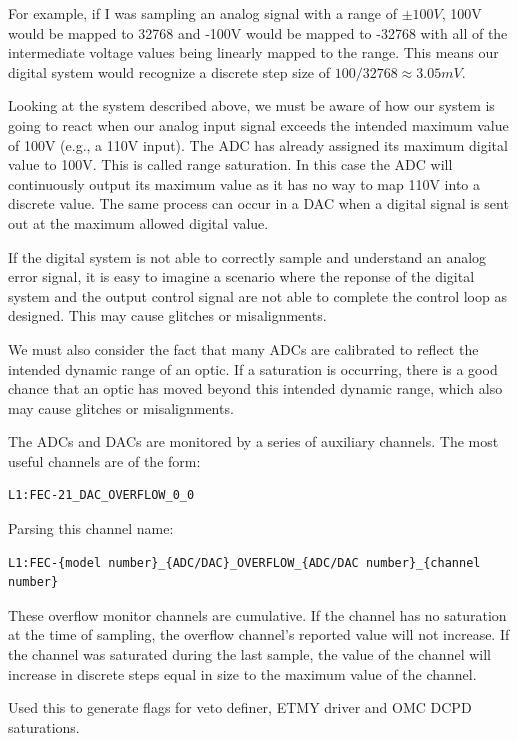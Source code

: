 For example, if I was sampling an analog signal with a range of $\pm100V$, 
100V would be mapped to 32768 and -100V would be mapped to -32768 with all 
of the intermediate voltage values being linearly mapped to the range. This 
means our digital system would recognize a discrete step size of 
$100/32768 \approx 3.05 mV$.

Looking at the system described above, we must be aware of how our system 
is going to react when our analog input signal exceeds the intended maximum 
value of 100V (e.g., a 110V input). The ADC has already assigned its maximum 
digital value to 100V. This is called range saturation. In this case the ADC 
will continuously output its maximum value as it has no way to map 110V into 
a discrete value. The same process can occur in a DAC when a digital signal 
is sent out at the maximum allowed digital value.

If the digital system is not able to correctly sample and understand an analog 
error signal, it is easy to imagine a scenario where the reponse of the digital 
system and the output control signal are not able to complete the control loop 
as designed. This may cause glitches or misalignments.

We must also consider the fact that many ADCs are calibrated to reflect the 
intended dynamic range of an optic.  If a saturation is occurring, there is 
a good chance that an optic has moved beyond this intended dynamic range, which 
also may cause glitches or misalignments.

The ADCs and DACs are monitored by a series of auxiliary channels. 
The most useful channels are of the form:

\begin{verbatim}
L1:FEC-21_DAC_OVERFLOW_0_0
\end{verbatim}

Parsing this channel name:

\begin{verbatim}
L1:FEC-{model number}_{ADC/DAC}_OVERFLOW_{ADC/DAC number}_{channel number}
\end{verbatim}

These overflow monitor channels are cumulative. If the channel has no saturation 
at the time of sampling, the overflow channel's reported value will not increase. 
If the channel was saturated during the last sample, the value of the channel will 
increase in discrete steps equal in size to the maximum value of the channel.

Used this to generate flags for veto definer, ETMY driver and OMC DCPD saturations.

